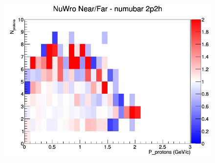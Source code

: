 \begin{figure}[h]
\endminipage
{}
\includegraphics[width=\linewidth]{N_P/nominal/protons/ratios/2p2h_NuWro_numubar_NF_N_P.png}
\endminipage
\newline
\end{figure}
\clearpage
